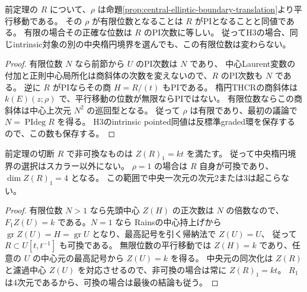 \begin{proposition}[有限境界位数はintrinsicなPI次数]
\label{prop:central-boundary-PI-invariant}
前定理の $R$ について、$\rho$ は命題\ref{prop:central-elliptic-boundary-translation}より平行移動である。
その $\rho$ が有限位数となることは $R$ がPIとなることと同値である。
有限の場合その正確な位数は $R$ のPI次数に等しい。
従ってH3の場合、同じintrinsic対象の別の中央楕円境界を選んでも、この有限位数は変わらない。
\end{proposition}
\begin{proof}
有限位数 $N$ なら前節から $U$ のPI次数は $N$ であり、
中心Laurent変数の付加と正則中心局所化は商斜体の次数を変えないので、$R$ のPI次数も $N$ である。
逆に $R$ がPIならその商 $H=R/(t)$ もPIである。
楕円THCRの商斜体は $k(E)(z;\rho)$ で、平行移動の位数が無限ならPIではない。
有限位数ならこの商斜体は中心上次元 $N^2$ の巡回型となる。
従って $\rho$ は有限であり、最初の議論で $N=\operatorname{PIdeg}R$ を得る。
H3のintrinsic pointed同値は反標準graded環を保存するので、この数も保存する。
\end{proof}

\begin{corollary}[非可換の場合の中央境界の一意性]
\label{cor:noncomm-central-boundary-unique}
前定理の切断 $R$ で非可換なものは $Z(R)_1=kt$ を満たす。
従って中央楕円境界の選択はスカラー以外にない。
$\rho=1$ の場合は $R$ 自身が可換であり、$\dim Z(R)_1=4$ となる。
この範囲で中央一次元の次元2または3は起こらない。
\end{corollary}
\begin{proof}
有限位数 $N>1$ なら先頭中心 $Z(H)$ の正次数は $N$ の倍数なので、
$F_1Z(U)=k$ である。$N=1$ なら Rainsの中心持上げから
$\operatorname{gr}Z(U)=H=\operatorname{gr}U$ となり、最高記号を引く帰納法で $Z(U)=U$、
従って $R\subset U[t,t^{-1}]$ も可換である。
無限位数の平行移動では $Z(H)=k$ であり、任意の $U$ の中心元の最高記号から
$Z(U)=k$ を得る。
中央元の同次化は $Z(R)$ と濾過中心 $Z(U)$ を対応させるので、非可換の場合は常に $Z(R)_1=kt$。
$R_1$ は4次元であるから、可換の場合は最後の結論も従う。
\end{proof}

